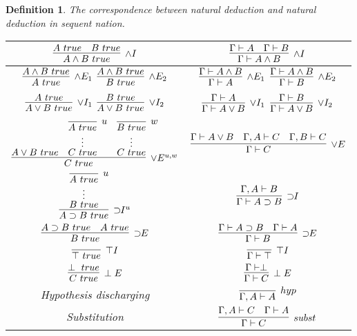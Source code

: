 \documentclass{article}
\theoremstyle{plain}
\newtheorem{definition}[theorem]{Definition}
\theoremstyle{nonumberplain}
\begin{document}
\begin{definition}
\rm The correspondence between natural deduction and natural deduction in sequent nation.
\begin{center}
\begin{tabular}{|c|c|}
\hline$\infer[\wedge I]{A \wedge B~true}{A~true & B~true}$ & $\infer[\wedge I]{\Gamma \vdash A \wedge B}{\Gamma \vdash A & \Gamma \vdash B}$ \rule{0mm}{10mm} \\
\hline$\infer[\wedge E_1]{A~true}{A \wedge B~true}$ \quad $\infer[\wedge E_2]{B~true}{A \wedge B~true}$ & $\infer[\wedge E_1]{\Gamma \vdash A}{\Gamma \vdash A \wedge B}$ \quad $\infer[\wedge E_2]{\Gamma \vdash B}{\Gamma \vdash A \wedge B}$ \rule{0mm}{10mm} \\
\hline$\infer[\vee I_1]{A \vee B~true}{A~true}$ \quad $\infer[\vee I_2]{A \vee B~true}{B~true}$ & $\infer[\vee I_1]{\Gamma \vdash A \vee B}{\Gamma \vdash A}$ \quad $\infer[\vee I_2]{\Gamma \vdash A \vee B}{\Gamma \vdash B}$ \rule{0mm}{10mm} \\
\hline $\infer[\vee E^{u,w}]{C~true}{A \vee B ~true & \deduce[\vdots]{C~true}{\infer[u]{A~true}{}} & \deduce[\vdots]{C~true}{\infer[w]{B~true}{}}}$ & $\infer[\vee E]{\Gamma \vdash C}{\Gamma \vdash A \vee B & \Gamma, A \vdash C & \Gamma, B \vdash C}$ \rule{0mm}{18mm} \\
\hline $\infer[\supset\!\!I^u]{A \supset B~true}{\deduce[\vdots]{B~true}{\infer[u]{A~true}{}}}$ & $\infer[\supset\!\!I]{\Gamma \vdash A \supset B}{\Gamma,A \vdash B}$ \rule{0mm}{18mm}  \\
\hline $\infer[\supset\!\!E]{B~true}{A\supset B~true & A~true}$ & $\infer[\supset\!\!E]{\Gamma \vdash B}{\Gamma \vdash A\supset B & \Gamma \vdash A}$ \rule{0mm}{10mm} \\
\hline $\infer[\top I]{\top ~true}{}$ & $\infer[\top I]{\Gamma \vdash \top}{}$ \rule{0mm}{10mm} \\
\hline $\infer[\perp E]{C~true}{\perp~true}$ & $\infer[\perp E]{\Gamma \vdash C}{\Gamma \vdash \perp}$ \rule{0mm}{10mm}\\
\hline Hypothesis discharging & $\infer[hyp]{\Gamma,A \vdash A}{}$ \rule{0mm}{10mm}\\
\hline Substitution & $\infer[subst]{\Gamma \vdash C}{\Gamma, A \vdash C & \Gamma \vdash A}$ \rule{0mm}{10mm}\\
\hline
\end{tabular}
\end{center}
\end{definition}
\end{document}
